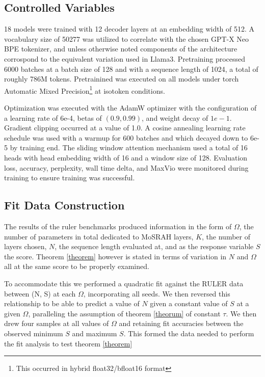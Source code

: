 \documentclass[11pt]{article}
\begin{document}
\subsection{Controlled Variables}

18 models were trained with 12 decoder layers at an embedding width of 512. A vocabulary size of 50277 was utilized to correlate with the chosen GPT-X Neo BPE tokenizer, and unless otherwise noted components of the architecture corrospond to the equivalent variation used in Llama3. Pretraining processed 6000 batches at a batch size of 128 and with a sequence length of 1024, a total of roughly 786M tokens. Pretrainined was executed on all models under torch Automatic Mixed Precision\footnote{This occurred in hybrid float32/bfloat16 format} at isotoken conditions.

Optimization was executed with the AdamW optimizer with the configuration of a learning rate of 6e-4, betas of $(0.9, 0.99)$, and weight decay of $1e-1$. Gradient clipping occurred at a value of 1.0. A cosine annealing learning rate schedule was used with a warmup for 600 batches and which decayed down to 6e-5 by training end. The sliding window attention mechanism used a total of 16 heads with head embedding width of 16 and a window size of 128. Evaluation loss, accuracy, perplexity, wall time delta, and MaxVio were monitored during training to ensure training was successful.

\subsection{Fit Data Construction}

The results of the ruler benchmarks produced information in the form of $\Omega$, the number of parameters in total dedicated to MoSRAH layers, $K$, the number of layers chosen, $N$, the sequence length evaluated at, and as the response variable $S$ the score. Theorem \ref{theorem} however is stated in terms of variation in $N$ and $\Omega$ all at the same score to be properly examined.

To accommodate this we performed a quadratic fit against the RULER data between (N, S) at each $\Omega$, incorporating all seeds. We then reversed this relationship to be able to predict a value of $N$ given a constant value of $S$ at a given $\Omega$, paralleling the assumption of theorem \ref{theorum} of constant $\tau$. We then drew four samples at all values of $\Omega$ and retaining fit accuracies between the observed minimum $S$ and maximum $S$. This formed the data needed to perform the fit analysis to test theorem \ref{theorem}
\end{document}
